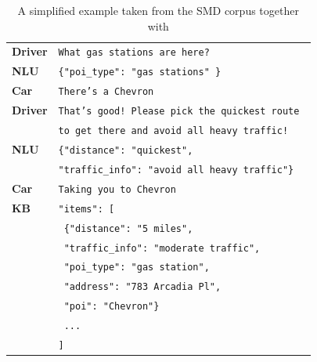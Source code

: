 \begin{table}[h]
    \centering
    \begin{tabular}{l|l}
    \toprule
         \textbf{Driver} & \texttt{What {\color{cyan!80!yellow!80!black!100}gas stations} are here?} \\
         \textbf{NLU} & \texttt{\{"poi\_type": "{\color{cyan!80!yellow!80!black!100}gas stations}" \}} \\
         \textbf{Car} & \texttt{There's a Chevron} \\
         \textbf{Driver} & \texttt{That's good! Please pick the {\color{cyan!80!yellow!80!black!100}quickest} route }\\ & \texttt{to get there and {\color{orange!50!yellow!90!black!100!}avoid all heavy traffic}!} \\
         \textbf{NLU} & \texttt{\{"distance": "{\color{cyan!80!yellow!80!black!100}quickest}",} \\
            & \texttt{"traffic\_info": "{\color{orange!50!yellow!90!black!100!}avoid all heavy traffic}"\} }\\
         \textbf{Car} & \texttt{Taking you to Chevron} \\
         \midrule
         \textbf{KB} & \texttt{"items": [} \\
          & \texttt{    \{"distance": "5 miles",} \\
          & \texttt{    "traffic\_info": "moderate traffic",} \\
          & \texttt{    "poi\_type": "gas station",} \\
          & \texttt{    "address": "783 Arcadia Pl",} \\
          & \texttt{    "poi": "Chevron"\}} \\
          & \texttt{    ...} \\
          & \texttt{]} \\
          \bottomrule
    \end{tabular}
    \caption{A simplified example taken from the SMD corpus together with }
    \label{02:tab:smd_example}
\end{table}

